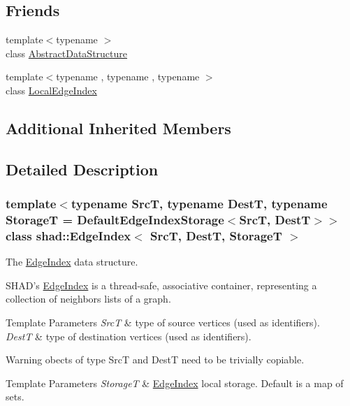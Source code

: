 \subsection*{Friends}
\begin{DoxyCompactItemize}
\item 
{\footnotesize template$<$typename $>$ }\\class \hyperlink{classshad_1_1EdgeIndex_ab18afa4496cc863ddc11bab94b2adf57}{Abstract\-Data\-Structure}
\item 
{\footnotesize template$<$typename , typename , typename $>$ }\\class \hyperlink{classshad_1_1EdgeIndex_afc8d107f39c9ea0b8848ea970eb36b93}{Local\-Edge\-Index}
\end{DoxyCompactItemize}
\subsection*{Additional Inherited Members}


\subsection{Detailed Description}
\subsubsection*{template$<$typename Src\-T, typename Dest\-T, typename Storage\-T = Default\-Edge\-Index\-Storage$<$\-Src\-T, Dest\-T$>$$>$class shad\-::\-Edge\-Index$<$ Src\-T, Dest\-T, Storage\-T $>$}

The \hyperlink{classshad_1_1EdgeIndex}{Edge\-Index} data structure. 

S\-H\-A\-D's \hyperlink{classshad_1_1EdgeIndex}{Edge\-Index} is a thread-\/safe, associative container, representing a collection of neighbors lists of a graph. 
\begin{DoxyTemplParams}{Template Parameters}
{\em Src\-T} & type of source vertices (used as identifiers). \\
\hline
{\em Dest\-T} & type of destination vertices (used as identifiers). \\
\hline
\end{DoxyTemplParams}
\begin{DoxyWarning}{Warning}
obects of type Src\-T and Dest\-T need to be trivially copiable. 
\end{DoxyWarning}

\begin{DoxyTemplParams}{Template Parameters}
{\em Storage\-T} & \hyperlink{classshad_1_1EdgeIndex}{Edge\-Index} local storage. Default is a map of sets. \\
\hline
\end{DoxyTemplParams}


